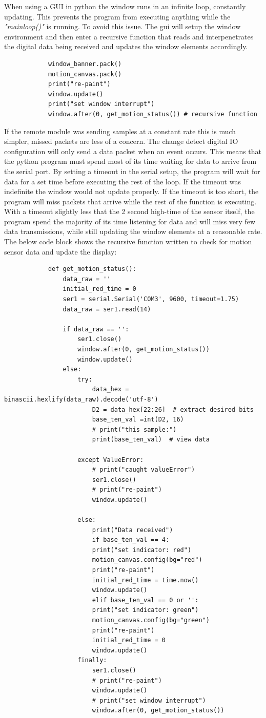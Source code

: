 		\par When using a GUI in python the window runs in an infinite loop, constantly updating. This prevents the program from executing anything while the \textit{"mainloop()"} is running. To avoid this issue. The gui will setup the window environment and then enter a recursive function that reads and interpenetrates the digital data being received and updates the window elements accordingly. 
		\begin{lstlisting}
			window_banner.pack()
			motion_canvas.pack()
			print("re-paint")
			window.update()
			print("set window interrupt")
			window.after(0, get_motion_status()) # recursive function
		\end{lstlisting}
		\par If the remote module was sending samples at a constant rate this is much simpler, missed packets are less of a concern. The change detect digital IO configuration will only send a data packet when an event occurs. This means that the python program must spend most of its time waiting for data to arrive from the serial port. By setting a timeout in the serial setup, the program will wait for data for a set time before executing the rest of the loop. If the timeout was indefinite the window would not update properly. If the timeout is too short, the program will miss packets that arrive while the rest of the function is executing. With a timeout slightly less that the 2 second high-time of the sensor itself, the program spend the majority of its time listening for data and will miss very few data transmissions, while still updating the window elements at a reasonable rate.\\
		The below code block shows the recursive function written to check for motion sensor data and update the display:
		\begin{lstlisting}
			def get_motion_status():
				data_raw = ''
				initial_red_time = 0
				ser1 = serial.Serial('COM3', 9600, timeout=1.75)
				data_raw = ser1.read(14)
				
				if data_raw == '':
					ser1.close()
					window.after(0, get_motion_status())
					window.update()
				else:
					try:
						data_hex = binascii.hexlify(data_raw).decode('utf-8')
						D2 = data_hex[22:26]  # extract desired bits
						base_ten_val =int(D2, 16)
						# print("this sample:")
						print(base_ten_val)  # view data
					
					except ValueError:
						# print("caught valueError")
						ser1.close()
						# print("re-paint")
						window.update()
					
					else:
						print("Data received")
						if base_ten_val == 4:
						print("set indicator: red")
						motion_canvas.config(bg="red")
						print("re-paint")
						initial_red_time = time.now()
						window.update()
						elif base_ten_val == 0 or '':
						print("set indicator: green")
						motion_canvas.config(bg="green")
						print("re-paint")
						initial_red_time = 0
						window.update()
					finally:
						ser1.close()
						# print("re-paint")
						window.update()
						# print("set window interrupt")
						window.after(0, get_motion_status())
		\end{lstlisting}
		
